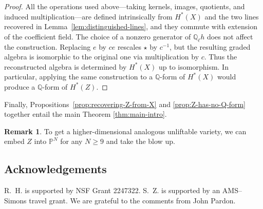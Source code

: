 \documentclass[11pt, reqno]{amsart}
\theoremstyle{definition}
\newtheorem{remark}[theorem]{Remark}
\newcommand\QQ{\mathbb{Q}}
\begin{document}
\begin{proof}
All the operations used above—taking kernels, images, quotients, and
induced multiplication—are defined intrinsically from $H^*(X)$ and the
two lines recovered in Lemma~\ref{lem:distinguished-lines}, and they
commute with extension of the coefficient field.  The choice of a
nonzero generator of $\QQ_\ell h$ does not affect the construction.
Replacing $e$ by $ce$ rescales $\star$ by $c^{-1}$, but the resulting
graded algebra is isomorphic to the original one via multiplication by
$c$.  Thus the reconstructed algebra is determined by $H^*(X)$ up to
isomorphism.  In particular, applying the same construction to a
$\QQ$-form of $H^*(X)$ would produce a $\QQ$-form of $H^*(Z)$.
\end{proof}

Finally, Propositions~\ref{prop:recovering-Z-from-X} and \ref{prop:Z-has-no-Q-form} together entail the main Theorem \ref{thm:main-intro}.

\begin{remark}
    To get a higher-dimensional analogous unliftable variety, we can embed $Z$ into $\mathbb{P}^N$ for any $N\geq 9$ and take the blow up.
\end{remark}


\subsection*{Acknowledgements}\;

R.~H. is supported by 
NSF Grant 2247322.
S.~Z. is supported by an AMS--Simons travel grant. We are grateful to the comments from John Pardon.











\end{document}
